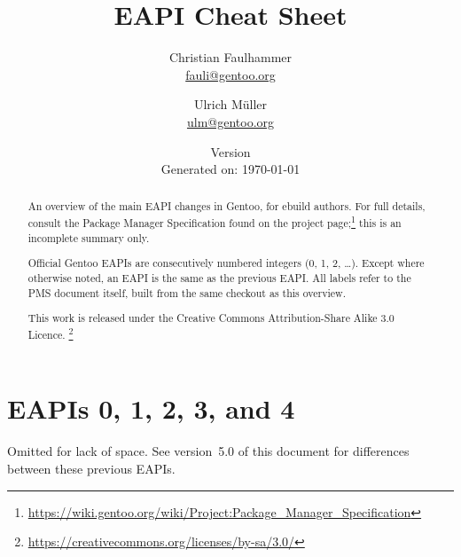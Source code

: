 \documentclass[a4paper,nofoldmark]{leaflet}
\title{EAPI Cheat Sheet}
\author{%
    Christian Faulhammer \\
    \href{mailto:fauli@gentoo.org}{fauli@gentoo.org}
    \and
    Ulrich Müller \\
    \href{mailto:ulm@gentoo.org}{ulm@gentoo.org}
}
\date{%
    Version \version \\
    \ifthenelse{\equal{\gitCommitterDate}{(None)}}
    {Generated on: \today}
    {\printdate{\gitCommitterDate}}%
}
\newcommand{\code}[1]{\texttt{#1}}
\newcommand{\featureref}[1]{\textsc{#1} on page~\pageref{feat:#1}}
\begin{document}
\maketitle
\thispagestyle{empty}
\begin{abstract}
    An overview of the main EAPI changes in Gentoo, for ebuild
    authors.  For full details, consult the Package Manager
    Specification found on the project page;\footnote{%
    \url{https://wiki.gentoo.org/wiki/Project:Package_Manager_Specification}}
    this is an incomplete summary only.

    Official Gentoo EAPIs are consecutively numbered integers (0, 1,
    2, \dots).  Except where otherwise noted, an EAPI is the same as
    the previous EAPI\@.  All labels refer to the PMS document itself,
    built from the same checkout as this overview.


    This work is released under the Creative Commons
    Attribution-Share Alike 3.0 Licence.%
    \footnote{\url{https://creativecommons.org/licenses/by-sa/3.0/}}
\end{abstract}

\section{EAPIs 0, 1, 2, 3, and 4}
\label{sec:cs:eapi0-2}
Omitted for lack of space. See version~5.0 of this document for
differences between these previous EAPIs.


\end{document}
